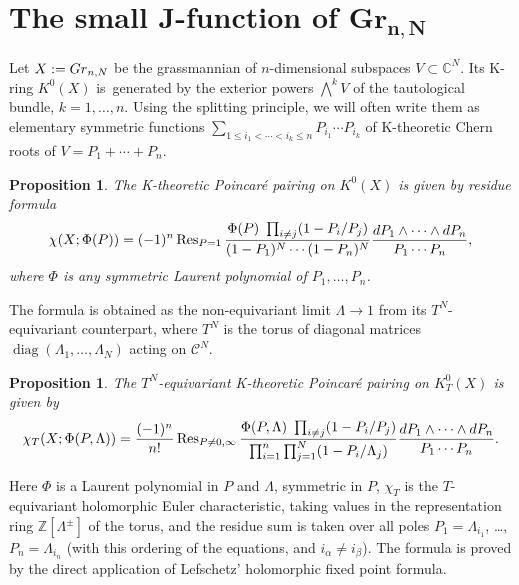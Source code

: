 \documentclass[11pt]{article}
\numberwithin{equation}{section}
\numberwithin{equation}{section}
\newtheorem{Proposition}[Theorem]{Proposition}
{ \theoremstyle{definition}
\newtheorem{Definition}[Theorem]{Definition}
\newtheorem{Example}[Theorem]{Example}
\newtheorem{Remark}[Theorem]{Remark} }
\def\C{\mathcal C}
\def\ZZ{\mathbb Z}
\def\CC{\mathbb C}
\def\Res{\operatorname{Res}}
\def\a{\alpha}
\def\b{\beta}
\begin{document}


\setcounter{section}{1}
\section[The small J-function of Gr {n,N}]{The small J-function of $\mathbf{Gr}_{\boldsymbol{n,N}}$}
\label{Sec2}

{\sloppy
Let $X:={\rm Gr}_{n,N}$ be the grassmannian of $n$-dimensional subspaces $V\subset \CC^N$. Its K-ring $K^0(X)$ is~generated by the exterior powers $\bigwedge^kV$ of the tautological bundle, $k=1,\dots,n$. Using the \mbox{splitting} principle, we will often write them as elementary symmetric functions $\sum_{1\leq i_1<\cdots<i_k\leq n}P_{i_1}\cdots P_{i_k}$ of K-theoretic Chern roots of $V=P_1+\cdots+P_n$.

}

\begin{Proposition} \label{prop1}
The K-theoretic Poincar{\'e} pairing on $K^0(X)$ is given by residue formula
\[
\chi(X; \Phi(P))= (-1)^n\Res_{P=1} \frac{\Phi(P) \ \prod_{i\neq j}(1-P_i/P_j)}{(1-P_1)^N\cdots(1-P_n)^N} \frac{{\rm d}P_1\wedge\cdots \wedge {\rm d}P_n}{P_1\cdots P_n},
\]
where $\Phi$ is any symmetric Laurent polynomial of $P_1,\dots,P_n$.
\end{Proposition}

The formula is obtained as the non-equivariant limit $\Lambda\to 1$ from its $T^N$-equivariant counterpart, where $T^N$ is the torus of diagonal matrices $\operatorname{diag}(\Lambda_1,\dots,\Lambda_N)$ acting on $\C^N$.

\begin{Proposition}\label{prop2}
The $T^N$-equivariant K-theoretic Poincar{\'e} pairing on $K^0_T(X)$ is given by
\[
\chi_T(X;\Phi(P,\Lambda))= \frac{(-1)^n}{n!} \Res_{P\neq 0,\infty} \frac{\Phi(P,\Lambda)\ \prod_{i\neq j}(1-P_i/P_j)}{\prod_{i=1}^n\prod_{j=1}^N(1-P_i/\Lambda_j)} \frac{{\rm d}P_1\wedge\cdots \wedge {\rm d}P_n}{P_1\cdots P_n}.
\]
\end{Proposition}
Here $\Phi$ is a Laurent polynomial in $P$ and $\Lambda$, symmetric in $P$, $\chi_T$ is the $T$-equivariant holomorphic Euler characteristic, taking values in the representation ring $\ZZ[\Lambda^{\pm}]$ of the torus, and the residue sum is taken over all poles $P_1=\Lambda_{i_1}$, \dots, $P_n=\Lambda_{i_n}$ (with this ordering of the equations, and $i_\a\neq i_\b$). The formula is proved by the direct application of Lefschetz' holomorphic fixed point formula.
\end{document}
